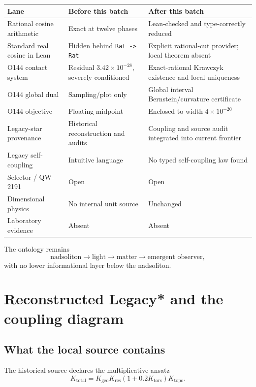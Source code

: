 \documentclass[11pt,a4paper]{article}
\begin{document}
\small
\begin{longtable}{p{}p{}p{}}
\toprule
Lane & Before this batch & After this batch\\\midrule
Rational cosine arithmetic & Exact at twelve phases & Lean-checked and
type-correctly reduced\\
Standard real cosine in Lean & Hidden behind \texttt{Rat -> Rat} & Explicit
rational-cut provider; local theorem absent\\
O144 contact system & Residual $3.42\times10^{-28}$, severely conditioned &
Exact-rational Krawczyk existence and local uniqueness\\
O144 global dual & Sampling/plot only & Global interval
Bernstein/curvature certificate\\
O144 objective & Floating midpoint & Enclosed to width $4\times10^{-20}$\\
Legacy-star provenance & Historical reconstruction and audits & Coupling and
source audit integrated into current frontier\\
Legacy self-coupling & Intuitive language & No typed self-coupling law found\\
Selector / QW-2191 & Open & Open\\
Dimensional physics & No internal unit source & Unchanged\\
Laboratory evidence & Absent & Absent\\
\bottomrule
\end{longtable}
\normalsize

The ontology remains
\[
\text{nadsoliton}\longrightarrow\text{light}\longrightarrow
\text{matter}\longrightarrow\text{emergent observer},
\]
with no lower informational layer below the nadsoliton.

\section{Reconstructed Legacy* and the coupling diagram}

\subsection{What the local source contains}

The historical source declares the multiplicative ansatz
\[
K_{\mathrm{total}}=K_{\mathrm{geo}}K_{\mathrm{res}}
(1+0.2K_{\mathrm{tors}})K_{\mathrm{topo}}.
\]
\end{document}
